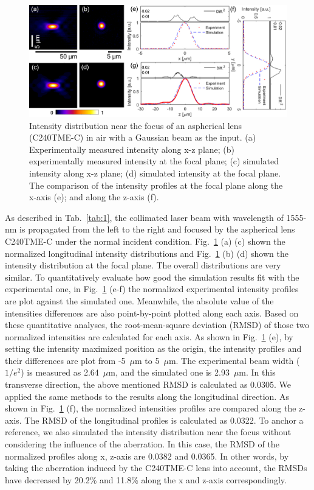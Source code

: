 \documentclass[9pt,twocolumn,twoside]{osajnl}
\begin{document}
\begin{figure}
	\centering
	\includegraphics[width=\linewidth]{../AppOptics/figures/C240TME-C.pdf}
	\caption{Intensity distribution near the focus of an aspherical lens (C240TME-C) in air with a Gaussian beam as the input. (a) Experimentally measured intensity along x-z plane; (b) experimentally measured intensity at the focal plane; (c) simulated intensity along x-z plane; (d) simulated intensity at the focal plane. The comparison of the intensity profiles at the focal plane along the x-axis (e); and along the z-axis (f).}\label{fig:3b}
\end{figure}
As described in Tab.~\ref{tab:1}, the collimated laser beam with wavelength of 1555-nm is propagated from the left to the right and focused by the aspherical lens C240TME-C under the normal incident condition. Fig.~\ref{fig:3b} (a) (c) shown the normalized longitudinal intensity distributions and Fig.~\ref{fig:3b} (b) (d) shown the intensity distribution at the focal plane. The overall distributions are very similar. To quantitatively evaluate how good the simulation results fit with the experimental one, in Fig.~\ref{fig:3b} (e-f) the normalized experimental intensity profiles are plot against the simulated one. Meanwhile, the absolute value of the intensities differences are also point-by-point plotted along each axis. Based on these quantitative analyses, the root-mean-square deviation (RMSD) of those two normalized intensities are calculated for each axis. As shown in Fig.~\ref{fig:3b} (e), by setting the intensity maximized position as the origin, the intensity profiles and their differences are plot from  -5~$\mu$m to 5~$\mu$m. The experimental beam width ($1/e^2$) is measured as 2.64~$\mu$m, and the simulated one is 2.93~$\mu$m. In this transverse direction, the above mentioned RMSD is calculated as 0.0305. We applied the same methods to the results along the longitudinal direction. As shown in Fig.~\ref{fig:3b} (f), the normalized intensities profiles are compared along the z-axis. The RMSD of the longitudinal profiles is calculated as 0.0322. To anchor a reference, we also simulated the intensity distribution near the focus without considering the influence of the aberration. In this case, the RMSD of the normalized profiles along x, z-axis are 0.0382 and 0.0365. In other words, by taking the aberration induced by the C240TME-C lens into account, the RMSDs have decreased by 20.2\% and 11.8\% along the x and z-axis correspondingly.
\end{document}
